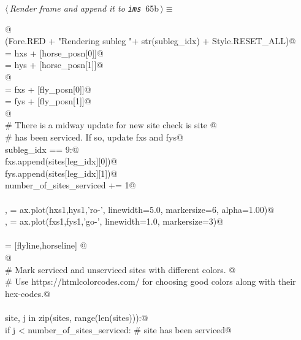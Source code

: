 \documentclass[11.5pt]{report}
\begin{document}
\begin{flushleft} \small\label{scrap95}\raggedright\small
{} $\langle\,${\itshape Render frame and append it to \verb|ims|}\nobreak\ {\footnotesize {65b}}$\,\rangle\equiv$
\vspace{-1ex}
\begin{list}{}{} \item
\mbox{}\verb@   @\\
\mbox{}\verb@debug(Fore.RED + "Rendering subleg "+ str(subleg_idx) + Style.RESET_ALL)@\\
\mbox{} = hxs + [horse_posn[0]]@\\
\mbox{} = hys + [horse_posn[1]]@\\
\mbox{}\verb@               @\\
\mbox{} = fxs + [fly_posn[0]]@\\
\mbox{} = fys + [fly_posn[1]]@\\
\mbox{}\verb@                 @\\
\mbox{}\verb@# There is a midway update for new site check is site @\\
\mbox{}\verb@# has been serviced. If so, update fxs and fys@\\
\mbox{}\verb@if subleg_idx == 9:@\\
\mbox{}\verb@    fxs.append(sites[leg_idx][0])@\\
\mbox{}\verb@    fys.append(sites[leg_idx][1])@\\
\mbox{}\verb@    number_of_sites_serviced += 1@\\
\mbox{}\verb@@\\
\mbox{}\verb@horseline, = ax.plot(hxs1,hys1,'ro-', linewidth=5.0, markersize=6, alpha=1.00)@\\
\mbox{}\verb@flyline,   = ax.plot(fxs1,fys1,'go-', linewidth=1.0, markersize=3)@\\
\mbox{}\verb@@\\
\mbox{}\verb@objs = [flyline,horseline] @\\
\mbox{}\verb@ @\\
\mbox{}\verb@# Mark serviced and unserviced sites with different colors. @\\
\mbox{}\verb@# Use https://htmlcolorcodes.com/ for choosing good colors along with their hex-codes.@\\
\mbox{}\verb@@\\
\mbox{}\verb@for site, j in zip(sites, range(len(sites))):@\\
\mbox{}\verb@    if j < number_of_sites_serviced:       # site has been serviced@\\

\end{list}
\end{flushleft}
\end{document}
